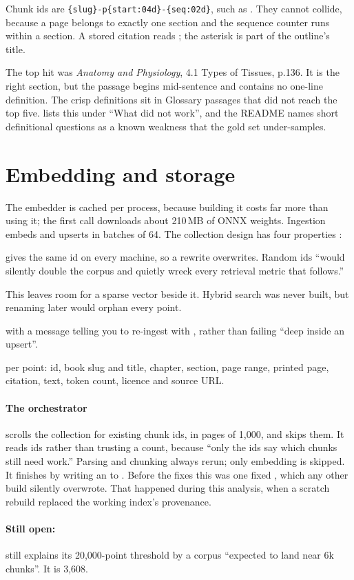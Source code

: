 Chunk ids are \texttt{\{slug\}-p\{start:04d\}-\{seq:02d\}}, such as . They cannot collide, because a page belongs to exactly one section and the sequence counter runs within a section. A stored citation reads ; the asterisk is part of the outline's title.

\begin{measured}
The top hit was \emph{Anatomy and Physiology}, 4.1 Types of Tissues, p.136. It is the right section, but the passage begins mid-sentence and contains no one-line definition. The crisp definitions sit in Glossary passages that did not reach the top five.  lists this under ``What did not work'', and the README names short definitional questions as a known weakness that the gold set under-samples.
\end{measured}

\section{Embedding and storage}
\label{sec:store}

The embedder is cached per process, because building it costs far more than using it; the first call downloads about 210\,MB of ONNX weights. Ingestion embeds and upserts in batches of 64. The collection design has four properties :
\begin{description}[style=nextline]
  \item[Deterministic ids.]  gives the same id on every machine, so a rewrite overwrites. Random ids ``would silently double the corpus and quietly wreck every retrieval metric that follows.''
  \item[A named vector, \code{dense}.] This leaves room for a sparse vector beside it. Hybrid search was never built, but renaming later would orphan every point.
  \item[Dimension mismatches fail early,] with a message telling you to re-ingest with , rather than failing ``deep inside an upsert''.
  \item[A 13-field payload] per point: id, book slug and title, chapter, section, page range, printed page, citation, text, token count, licence and source URL.
\end{description}

\paragraph{The orchestrator}  scrolls the collection for existing chunk ids, in pages of 1,000, and skips them. It reads ids rather than trusting a count, because ``only the ids say which chunks still need work.'' Parsing and chunking always rerun; only embedding is skipped. It finishes by writing an  to . Before the fixes this was one fixed , which any other build silently overwrote. That happened during this analysis, when a scratch rebuild replaced the working index's provenance.

\paragraph{Still open:}  still explains its 20,000-point threshold by a corpus ``expected to land near 6k chunks''. It is 3,608.
